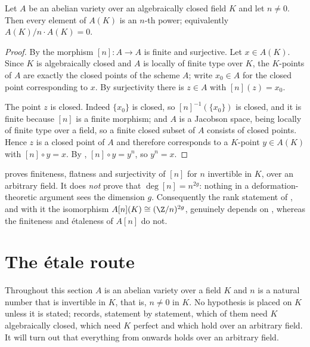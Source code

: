 \begin{proposition}
\label{prop:av-divisibility}
\leanok
Let $A$ be an abelian variety over an algebraically closed field $K$ and let
$n\neq0$.  Then every element of $A(K)$ is an $n$-th power; equivalently
$A(K)/n\cdot A(K)=0$.
\end{proposition}
\begin{proof}
\leanok
By  the morphism $[n]\colon A\to A$ is finite and
surjective.  Let $x\in A(K)$.  Since $K$ is algebraically closed and $A$ is
locally of finite type over $K$, the $K$-points of $A$ are exactly the closed
points of the scheme $A$; write $x_0\in A$ for the closed point corresponding
to $x$.  By surjectivity there is $z\in A$ with $[n](z)=x_0$.

The point $z$ is closed.  Indeed $\{x_0\}$ is closed, so $[n]^{-1}(\{x_0\})$ is
closed, and it is finite because $[n]$ is a finite morphism; and $A$ is a
Jacobson space, being locally of finite type over a field, so a finite closed
subset of $A$ consists of closed points.  Hence $z$ is a closed point of $A$
and therefore corresponds to a $K$-point $y\in A(K)$ with $[n]\circ y=x$.  By
, $[n]\circ y=y^n$, so $y^n=x$.
\end{proof}

\begin{remark}
\label{rem:av-etale-route-scope}
 proves finiteness, flatness and surjectivity of $[n]$
for $n$ invertible in $K$, over an arbitrary field.  It does \emph{not} prove
that $\deg[n]=n^{2g}$: nothing in a deformation-theoretic argument sees the
dimension $g$.  Consequently the rank statement of
, and with it the isomorphism
$A[n](K)\cong(\Z/n)^{2g}$, genuinely depends on , whereas the
finiteness and \'etaleness of $A[n]$ do not.
\end{remark}

\section{The \'etale route}\label{sec:av-etale-route}

Throughout this section $A$ is an abelian variety over a field $K$ and $n$ is a
natural number that is invertible in $K$, that is, $n\neq0$ in $K$.  No
hypothesis is placed on $K$ unless it is stated; 
records, statement by statement, which of them need $K$ algebraically closed,
which need $K$ perfect and which hold over an arbitrary field.  It will turn out
that everything from  onwards holds over an arbitrary
field.

